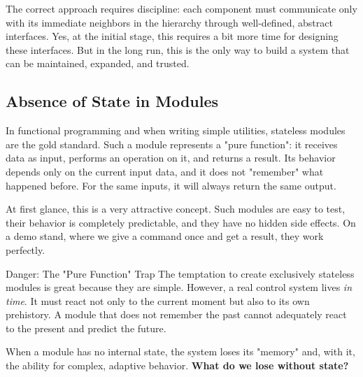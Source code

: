 The correct approach requires discipline: each component must communicate only with its immediate neighbors in the hierarchy through well-defined, abstract interfaces. Yes, at the initial stage, this requires a bit more time for designing these interfaces. But in the long run, this is the only way to build a system that can be maintained, expanded, and trusted.

\subsection{Absence of State in Modules}

In functional programming and when writing simple utilities, stateless modules are the gold standard. Such a module represents a "pure function": it receives data as input, performs an operation on it, and returns a result. Its behavior depends only on the current input data, and it does not "remember" what happened before. For the same inputs, it will always return the same output.

At first glance, this is a very attractive concept. Such modules are easy to test, their behavior is completely predictable, and they have no hidden side effects. On a demo stand, where we give a command once and get a result, they work perfectly.

\begin{dangerbox}{Danger: The "Pure Function" Trap}
The temptation to create exclusively stateless modules is great because they are simple. However, a real control system lives \textit{in time}. It must react not only to the current moment but also to its own prehistory. A module that does not remember the past cannot adequately react to the present and predict the future.
\end{dangerbox}

When a module has no internal state, the system loses its "memory" and, with it, the ability for complex, adaptive behavior. \textbf{What do we lose without state?}

